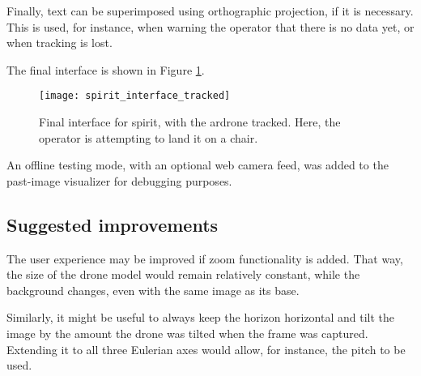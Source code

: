     Finally, text can be superimposed using orthographic projection, if it is necessary.
    This is used, for instance, when warning the operator that there is no data yet, or when tracking is lost.

    The final interface is shown in Figure \ref{fig:spirit_interface_tracked}.

    \begin{figure}[h]
      \centering
      \texttt{[image: spirit\_interface\_tracked]}
      \caption[SPIRIT final interface]{Final interface for \gls{spirit}, with the \gls{ardrone} tracked. Here, the operator is attempting to land it on a chair.}
      \label{fig:spirit_interface_tracked}
    \end{figure}
    
    An offline testing mode, with an optional web camera feed, was added to the past-image visualizer for debugging purposes.


  \subsection{Suggested improvements}
    The user experience may be improved if zoom functionality is added.
    That way, the size of the drone model would remain relatively constant, while the background changes, even with the same image as its base.
    
    Similarly, it might be useful to always keep the horizon horizontal and tilt the image by the amount the drone was tilted when the frame was captured.
    Extending it to all three Eulerian axes would allow, for instance, the pitch to be used.

